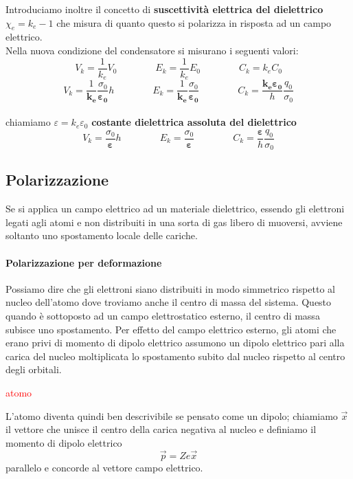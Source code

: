 \documentclass[x11names]{report}
\begin{document}
Introduciamo inoltre il concetto di \textbf{suscettività elettrica del dielettrico} \(\chi_e = k_e - 1\) che  misura di quanto questo si polarizza in risposta ad un campo elettrico. \\

\noindent
Nella nuova condizione del condensatore si misurano i seguenti valori:
\[
V_k = \frac{1}{k_e}V_0 \qquad\qquad E_k = \frac{1}{k_e}E_0 \qquad\qquad C_k = k_eC_0
\]
\[
V_k = \frac{1}{\boldsymbol{k_e}}\frac{\sigma_0}{\boldsymbol{\varepsilon_0}}h \qquad\qquad E_k = \frac{1}{\boldsymbol{k_e}}\frac{\sigma_0}{\boldsymbol{\varepsilon_0}} \qquad\qquad C_k = \frac{\boldsymbol{k_e\varepsilon_0}}{h}\frac{q_0}{\sigma_0}
\]\\
chiamiamo \(\varepsilon = k_e\varepsilon_0\) \textbf{costante  dielettrica assoluta del dielettrico}
\[
V_k = \frac{\sigma_0}{\boldsymbol{\varepsilon}}h \qquad\qquad E_k = \frac{\sigma_0}{\boldsymbol{\varepsilon}} \qquad\qquad C_k = \frac{\boldsymbol{\varepsilon}}{h}\frac{q_0}{\sigma_0}
\]
\subsection{Polarizzazione}
Se si applica un campo elettrico ad un materiale dielettrico, essendo gli elettroni legati agli atomi e non distribuiti in una sorta di gas libero di muoversi, avviene soltanto uno spostamento locale delle cariche.


\paragraph*{Polarizzazione per deformazione}
Possiamo dire che gli elettroni siano distribuiti in modo simmetrico rispetto al nucleo dell'atomo dove troviamo anche il centro di massa del sistema. Questo quando è sottoposto ad un campo elettrostatico esterno, il centro di massa subisce uno spostamento. Per effetto del campo elettrico esterno, gli atomi che erano privi di momento di dipolo elettrico assumono un dipolo elettrico pari alla carica del nucleo moltiplicata lo spostamento subito dal nucleo rispetto al centro degli orbitali.

\begin{center}
	\textcolor{red}{atomo}
\end{center}

L'atomo diventa quindi ben descrivibile se pensato come un dipolo; chiamiamo \(\vec{x}\) il vettore che unisce il centro della carica negativa al nucleo e definiamo il momento di dipolo elettrico
\[
\vec{p} = Z e \vec{x}
\]
parallelo e concorde al vettore campo elettrico.
\end{document}

